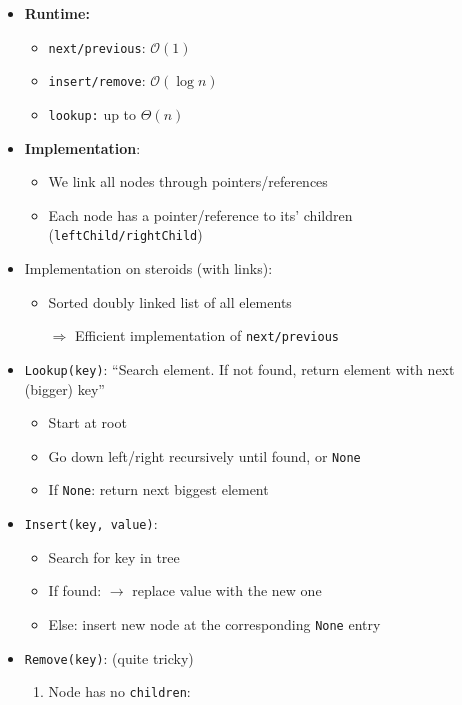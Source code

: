 \documentclass[12pt, a4paper]{scrartcl}
\newcommand{\bigO}{\mathcal{O}}
\renewcommand{\implies}{\Rightarrow}
\begin{document}
\begin{itemize}
\begin{figure}[htbp]
\begin{subfigure}[b]{.47\textwidth}
      \caption{Binary search tree with doubly linked list}
    \end{subfigure}
  \end{figure}
\item \textbf{Runtime:}
  \begin{itemize}
  \item \texttt{next/previous}: $\bigO(1)$
  \item \texttt{insert/remove}: $\bigO(\log n)$
  \item \texttt{lookup:} up to $\Theta(n)$
  \end{itemize}
\item \textbf{Implementation}:
  \begin{itemize}
  \item We link all nodes through pointers/references
  \item Each node has a pointer/reference to its' children (\texttt{leftChild/rightChild})
  \end{itemize}
\item Implementation on steroids (with links):
  \begin{itemize}
  \item Sorted doubly linked list of all elements
  \item[$\implies$] Efficient implementation of \texttt{next/previous}
  \end{itemize}
\item \texttt{Lookup(key)}: ``Search element. If not found, return element with next (bigger) key''
  \begin{itemize}
  \item Start at root
  \item Go down left/right recursively until found, or \texttt{None}
  \item If \texttt{None}: return next biggest element
  \end{itemize}
\item \texttt{Insert(key, value)}:
  \begin{itemize}
  \item Search for key in tree
  \item If found: $\rightarrow$ replace value with the new one
  \item Else: insert new node at the corresponding \texttt{None} entry
  \end{itemize}
\item \texttt{Remove(key)}: (quite tricky)
  \begin{enumerate}
  \item Node has no \texttt{children}:

\end{enumerate}
\end{itemize}
\end{document}
